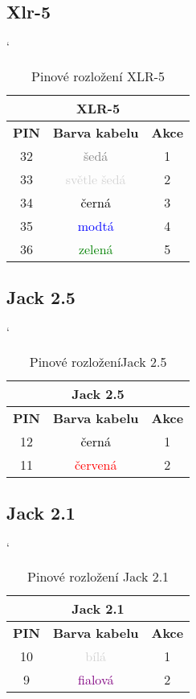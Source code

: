 \subsection{Xlr-5}

\begin{table} [H]
	\centering
	\catcode`
	\begin{tabular}[c]{|| c | c | c ||}
	\hline
		\multicolumn{3}{||c||}{XLR-5} \\
	\hline
 		 \textbf{PIN} & \textbf{Barva kabelu} & \textbf{Akce}\\
	\hline
		32 & \textcolor{gray}{šedá} & 1\\
	\hline
		33 & \textcolor{lightgray}{světle šedá} & 2 \\
	\hline
		34 & \textcolor{black}{černá} & 3 \\
	\hline
		35 & \textcolor{blue}{modtá} & 4 \\
	\hline
		36 & \textcolor{green}{zelená} & 5 \\
	\hline
	\end{tabular}
	\caption{Pinové rozložení XLR-5}
	\label{table:pinXLR-5}
\end{table}

\subsection{Jack 2.5}

\begin{table} [h!]
	\centering
	\catcode`
	\begin{tabular}[c]{|| c | c | c ||}
	\hline
		\multicolumn{3}{||c||}{Jack 2.5} \\
	\hline
 		 \textbf{PIN} & \textbf{Barva kabelu} & \textbf{Akce}\\
	\hline
		12 & \textcolor{black}{černá} & 1\\
	\hline
		11 & \textcolor{red}{červená} & 2 \\
	\hline
	\end{tabular}
	\caption{Pinové rozloženíJack 2.5}
	\label{table:pinj25}
\end{table}

\subsection{Jack 2.1}

\begin{table} [h!]
	\centering
	\catcode`
	\begin{tabular}[c]{|| c | c | c ||}
	\hline
		\multicolumn{3}{||c||}{Jack 2.1} \\
	\hline
 		 \textbf{PIN} & \textbf{Barva kabelu} & \textbf{Akce}\\
	\hline
		10 & \textcolor{lightgray}{bílá} & 1\\
	\hline
		9 & \textcolor{purple}{fialová} & 2 \\
	\hline
	\end{tabular}
	\caption{Pinové rozložení Jack 2.1}
	\label{table:pinj25}
\end{table}

